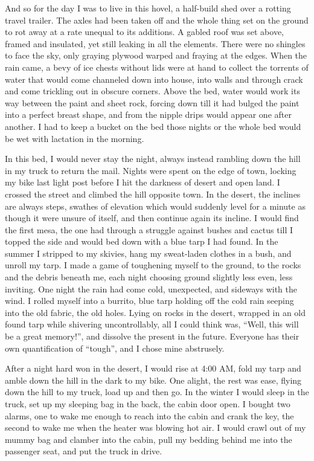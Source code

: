 \documentclass[ebook, 10pt, openright, onecolumn]{memoir}
\begin{document}
And so for the day I was to live in this hovel, a half-build shed over a rotting
travel trailer.  The axles had been taken off and the whole thing set on the
ground to rot away at a rate unequal to its additions.  A gabled roof was set
above, framed and insulated, yet still leaking in all the elements.  There were
no shingles to face the sky, only graying plywood warped and fraying at the
edges.  When the rain came, a bevy of ice chests without lids were at hand to
collect the torrents of water that would come channeled down into house, into
walls and through crack and come trickling out in obscure corners.  Above the
bed, water would work its way between the paint and sheet rock, forcing down
till it had bulged the paint into a perfect breast shape, and from the nipple
drips would appear one after another.  I had to keep a bucket on the bed those
nights or the whole bed would be wet with lactation in the morning.

In this bed, I would never stay the night, always instead rambling down the hill
in my truck to return the mail.  Nights were spent on the edge of town, locking
my bike last light post before I hit the darkness of desert and open land.  I
crossed the street and climbed the hill opposite town.  In the desert, the
inclines are always steps, swathes of elevation which would suddenly level for a
minute as though it were unsure of itself, and then continue again its incline.
I would find the first mesa, the one had through a struggle against bushes and
cactus till I topped the side and would bed down with a blue tarp I had found.
In the summer I stripped to my skivies, hang my sweat-laden clothes in a bush,
and unroll my tarp.  I made a game of toughening myself to the ground, to the
rocks and the debris beneath me, each night choosing ground slightly less even,
less inviting.  One night the rain had come cold, unexpected, and sideways with
the wind.  I rolled myself into a burrito, blue tarp holding off the cold rain
seeping into the old fabric, the old holes.  Lying on rocks in the desert,
wrapped in an old found tarp while shivering uncontrollably, all I could think
was, ``Well, this will be a great memory!'', and dissolve the present in the
future.  Everyone has their own quantification of ``tough'', and I chose mine
abstrusely.

After a night hard won in the desert, I would rise at 4:00 AM, fold my tarp and
amble down the hill in the dark to my bike.  One alight, the rest was ease,
flying down the hill to my truck, load up and then go.  In the winter I would
sleep in the truck, set up my sleeping bag in the back, the cabin door open.
I bought two alarms, one to wake me enough to reach into the cabin and crank the
key, the second to wake me when the heater was blowing hot air.  I would crawl
out of my mummy bag and clamber into the cabin, pull my bedding behind me into
the passenger seat, and put the truck in drive.
\end{document}
